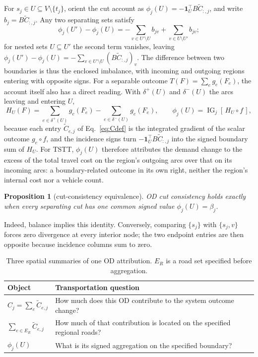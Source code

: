 \documentclass[a4paper,fleqn]{cas-sc}
\newtheorem*{uproposition}{Proposition}
\begin{document}
For $s_j\in U\subseteq V\setminus\{t_j\}$, orient the cut account as
$\phi_j(U)=-\mathbf1_U^\top B\widetilde C_{:,j}$, and write
$b_j=B\widetilde C_{:,j}$. Any two separating sets satisfy
\begin{equation}
\phi_j(U')-\phi_j(U)
=-\sum_{v\in U'\setminus U}b_{jv}
+\sum_{v\in U\setminus U'}b_{jv};
\label{eq:cutdiff}
\end{equation}
for nested sets $U\subseteq U'$ the second term vanishes, leaving
$\phi_j(U')-\phi_j(U)=-\sum_{v\in U'\setminus U}(B\widetilde C_{:,j})_v$.
The difference between two boundaries is thus the enclosed imbalance,
with incoming and outgoing regions entering with opposite signs.
For a separable outcome $T(F)=\sum_e g_e(F_e)$, the account itself
also has a direct reading. With $\delta^+(U)$ and $\delta^-(U)$ the
arcs leaving and entering $U$,
\begin{equation}
H_U(F)=\sum_{e\in\delta^+(U)}g_e(F_e)-\sum_{e\in\delta^-(U)}g_e(F_e),
\qquad
\phi_j(U)=\operatorname{IG}_j[\,H_U\circ f\,],
\label{eq:hboundary}
\end{equation}
because each entry $\widetilde C_{e,j}$ of Eq.~\eqref{eq:Cdef} is the
integrated gradient of the scalar outcome $g_e\circ f$, and the
incidence signs turn $-\mathbf 1_U^\top B\widetilde C_{:,j}$ into the
signed boundary sum of $H_U$. For TSTT, $\phi_j(U)$ therefore
attributes the demand change to the excess of the total travel cost on
the region's outgoing arcs over that on its incoming arcs: a
boundary-related outcome in its own right, neither the region's
internal cost nor a vehicle count.
\begin{uproposition}[cut-consistency equivalence]\label{par:cutequiv}
OD cut consistency holds exactly when every separating cut has one common
signed value $\phi_j(U)=\beta_j$.
\end{uproposition}
Indeed, balance implies this identity. Conversely, comparing $\{s_j\}$
with $\{s_j,v\}$ forces zero divergence at every interior node; the two
endpoint entries are then opposite because incidence columns sum to zero.

\begin{table}[pos=tb]
\caption{Three spatial summaries of one OD attribution. $E_R$ is a road set
specified before aggregation.}\label{tab:objects}
\begin{tabular*}{\tblwidth}{@{}p{5cm}p{9cm}@{}}
\toprule Object & Transportation question\\\midrule
$C_j=\sum_e\widetilde C_{e,j}$ & How much does this OD contribute to the system outcome change?\\
$\sum_{e\in E_R}\widetilde C_{e,j}$ & How much of that contribution is located on the specified regional roads?\\
$\phi_j(U)$ & What is its signed aggregation on the specified boundary?\\
\bottomrule\end{tabular*}\end{table}
\end{document}
